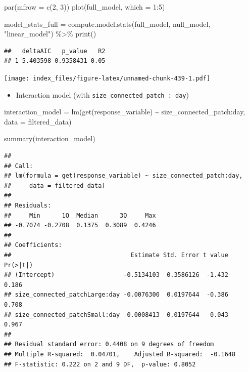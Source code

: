 \documentclass[
]{article}
\newenvironment{Shaded}{\begin{snugshade}}{\end{snugshade}}
\newcommand{\AttributeTok}[1]{\textcolor[rgb]{0.77,0.63,0.00}{#1}}
\newcommand{\DecValTok}[1]{\textcolor[rgb]{0.00,0.00,0.81}{#1}}
\newcommand{\FunctionTok}[1]{\textcolor[rgb]{0.00,0.00,0.00}{#1}}
\newcommand{\NormalTok}[1]{#1}
\newcommand{\OtherTok}[1]{\textcolor[rgb]{0.56,0.35,0.01}{#1}}
\newcommand{\SpecialCharTok}[1]{\textcolor[rgb]{0.00,0.00,0.00}{#1}}
\newcommand{\StringTok}[1]{\textcolor[rgb]{0.31,0.60,0.02}{#1}}
\providecommand{\tightlist}{%
  \setlength{\itemsep}{0pt}\setlength{\parskip}{0pt}}
\begin{document}
\begin{Shaded}
\begin{Highlighting}[]
\FunctionTok{par}\NormalTok{(}\AttributeTok{mfrow =} \FunctionTok{c}\NormalTok{(}\DecValTok{2}\NormalTok{, }\DecValTok{3}\NormalTok{))}
\FunctionTok{plot}\NormalTok{(full\_model, }\AttributeTok{which =} \DecValTok{1}\SpecialCharTok{:}\DecValTok{5}\NormalTok{)}

\NormalTok{model\_stats\_full }\OtherTok{=} \FunctionTok{compute.model.stats}\NormalTok{(full\_model,}
\NormalTok{                                       null\_model,}
                                       \StringTok{"linear\_model"}\NormalTok{) }\SpecialCharTok{\%\textgreater{}\%}
  \FunctionTok{print}\NormalTok{()}
\end{Highlighting}
\end{Shaded}

\begin{verbatim}
##   deltaAIC   p_value   R2
## 1 5.403598 0.9358431 0.05
\end{verbatim}

\texttt{[image: index\_files/figure-latex/unnamed-chunk-439-1.pdf]}

\begin{itemize}
\tightlist
\item
  Interaction model (with \texttt{size\_connected\_patch\ :\ day})
\end{itemize}

\begin{Shaded}
\begin{Highlighting}[]
\NormalTok{interaction\_model }\OtherTok{=} \FunctionTok{lm}\NormalTok{(}\FunctionTok{get}\NormalTok{(response\_variable) }\SpecialCharTok{\textasciitilde{}}
\NormalTok{                         size\_connected\_patch}\SpecialCharTok{:}\NormalTok{day,}
                       \AttributeTok{data =}\NormalTok{ filtered\_data)}

\FunctionTok{summary}\NormalTok{(interaction\_model)}
\end{Highlighting}
\end{Shaded}

\begin{verbatim}
## 
## Call:
## lm(formula = get(response_variable) ~ size_connected_patch:day, 
##     data = filtered_data)
## 
## Residuals:
##     Min      1Q  Median      3Q     Max 
## -0.7074 -0.2708  0.1375  0.3089  0.4246 
## 
## Coefficients:
##                                 Estimate Std. Error t value Pr(>|t|)
## (Intercept)                   -0.5134103  0.3586126  -1.432    0.186
## size_connected_patchLarge:day -0.0076300  0.0197644  -0.386    0.708
## size_connected_patchSmall:day  0.0008413  0.0197644   0.043    0.967
## 
## Residual standard error: 0.4408 on 9 degrees of freedom
## Multiple R-squared:  0.04701,    Adjusted R-squared:  -0.1648 
## F-statistic: 0.222 on 2 and 9 DF,  p-value: 0.8052
\end{verbatim}
\end{document}
